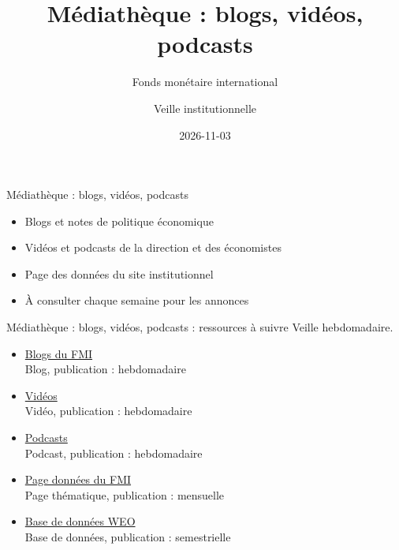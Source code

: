 \documentclass[aspectratio=169,11pt]{beamer}
\title{Médiathèque : blogs, vidéos, podcasts}
\subtitle{Fonds monétaire international}
\author{Veille institutionnelle}
\date{2026-11-03}
\begin{document}
\begin{frame}\titlepage\end{frame}

\begin{frame}{Médiathèque : blogs, vidéos, podcasts}
\begin{itemize}
\item Blogs et notes de politique économique
\item Vidéos et podcasts de la direction et des économistes
\item Page des données du site institutionnel
\item À consulter chaque semaine pour les annonces
\end{itemize}
\end{frame}

\begin{frame}{Médiathèque : blogs, vidéos, podcasts : ressources à suivre}
\small
Veille hebdomadaire.
\begin{itemize}
\item \href{https://www.imf.org/en/Blogs}{Blogs du FMI}\\{\footnotesize Blog, publication : hebdomadaire}
\item \href{https://www.imf.org/en/Videos}{Vidéos}\\{\footnotesize Vidéo, publication : hebdomadaire}
\item \href{https://www.imf.org/en/Podcasts}{Podcasts}\\{\footnotesize Podcast, publication : hebdomadaire}
\item \href{https://www.imf.org/en/Data}{Page données du FMI}\\{\footnotesize Page thématique, publication : mensuelle}
\item \href{https://www.imf.org/en/Publications/WEO/weo-database}{Base de données WEO}\\{\footnotesize Base de données, publication : semestrielle}
\end{itemize}
\end{frame}
\end{document}

